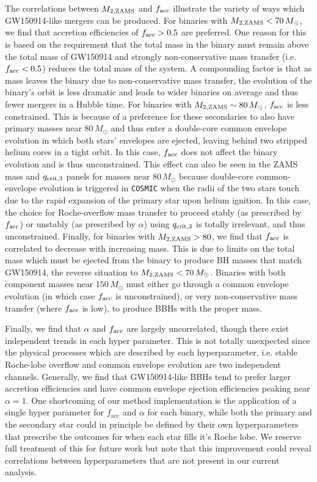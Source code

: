 \documentclass[twocolumn]{aastex631}
\begin{document}
The correlations between $M_{2,\rm{ZAMS}}$ and $f_{\rm acc}$ illustrate the
variety of ways which GW150914-like mergers can be produced. For binaries with
$M_{2,\rm{ZAMS}} < 70\,M_{\odot}$, we find that accretion efficiencies of
$f_{\rm acc} > 0.5$ are preferred. One reason for this is based on the
requirement that the total mass in the binary must remain above the total mass
of GW150914 and strongly non-conservative mass transfer (i.e. $f_{\rm acc} <
0.5$) reduces the total mass of the system. A compounding factor is that as mass
leaves the binary due to non-conservative mass transfer, the evolution of the
binary's orbit is less dramatic and leads to wider binaries on average and thus
fewer mergers in a Hubble time. For binaries with $M_{2,\rm{ZAMS}} \sim
80\,M_{\odot}$, $f_{\rm acc}$ is less constrained. This is because of a
preference for these secondaries to also have primary masses near $
80\,M_{\odot}$ and thus enter a double-core common envelope evolution in which
both stars' envelopes are ejected, leaving behind two stripped helium cores in a
tight orbit. In this case, $f_{\rm acc}$ does not affect the binary evolution
and is thus unconstrained. This effect can also be seen in the ZAMS mass and
$q_{\rm crit, 3}$ panels for masses near $80\,M_{\odot}$ because double-core
common-envelope evolution is triggered in \texttt{COSMIC} when the radii of the
two stars touch due to the rapid expansion of the primary star upon helium
ignition. In this case, the choice for Roche-overflow mass transfer to proceed
stably (as prescribed by $f_{\rm{acc}}$) or unstably (as prescribed by $\alpha$)
using $q_{\rm crit, 3}$ is totally irrelevant, and thus unconstrained. Finally,
for binaries with $M_{2,\rm{ZAMS}} > 80$, we find that $f_{\rm acc}$ is
correlated to decrease with increasing mass. This is due to limits on the total
mass which must be ejected from the binary to produce BH masses that match
GW150914, the reverse situation to $M_{2,\rm{ZAMS}} < 70 \, M_\odot$. Binaries
with both component masses near $150\,M_{\odot}$ must either go through a common
envelope evolution (in which case $f_{\rm acc}$ is unconstrained), or very
non-conservative mass transfer (where $f_{\rm acc}$ is low), to produce BBHs
with the proper mass.

Finally, we find that $\alpha$ and $f_{\rm acc}$ are largely uncorrelated,
though there exist independent trends in each hyper parameter. This is not
totally unexpected since the physical processes which are described by each
hyperparameter, i.e. stable Roche-lobe overflow and common envelope evolution
are two independent channels. Generally, we find that GW150914-like BBHs tend to
prefer larger accretion efficiencies and have common envelope ejection
efficiencies peaking near $\alpha=1$. One shortcoming of our method
implementation is the application of a single hyper parameter for
$f_{\mathrm{acc}}$ and $\alpha$ for each binary, while both the primary and the
secondary star could in principle be defined by their own hyperparameters that
prescribe the outcomes for when each star fills it's Roche lobe. We reserve full
treatment of this for future work but note that this improvement could reveal
correlations between hyperparameters that are not present in our current
analysis.
\end{document}
